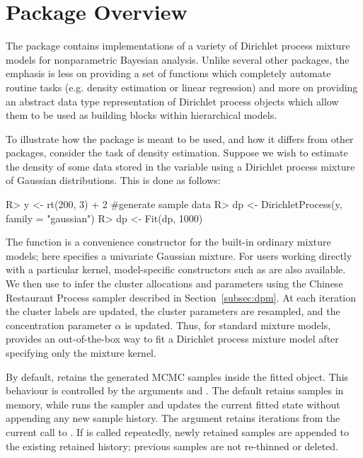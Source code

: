 \documentclass[nojss]{jss}
\begin{document}
\section{Package Overview}
\label{sec:package}

The  package contains implementations of a variety of Dirichlet process mixture models for nonparametric Bayesian analysis. Unlike several other  packages, the emphasis is less on providing a set of functions which completely automate routine tasks (e.g. density estimation or linear regression) and more on providing an abstract data type representation of Dirichlet process objects which allow them to be used as building blocks within hierarchical models.


To illustrate how the package is meant to be used, and how it differs from other  packages, consider the task of density estimation. Suppose we wish to estimate the density of some data stored in the variable  using a Dirichlet process mixture of Gaussian distributions. This is done as follows:

\begin{CodeInput}
R> y <- rt(200, 3) + 2 #generate sample data
R> dp <- DirichletProcess(y, family = "gaussian")
R> dp <- Fit(dp, 1000)
\end{CodeInput}
The function  is a convenience constructor for the built-in ordinary mixture models; here  specifies a univariate Gaussian mixture. For users working directly with a particular kernel, model-specific constructors such as  are also available. We then use  to infer the cluster allocations and parameters using the Chinese Restaurant Process sampler described in Section~\ref{subsec:dpm}. At each iteration the cluster labels are updated, the cluster parameters are resampled, and the concentration parameter $\alpha$ is updated. Thus, for standard mixture models,  provides an out-of-the-box way to fit a Dirichlet process mixture model after specifying only the mixture kernel.

By default,  retains the generated MCMC samples inside the fitted object. This behaviour is controlled by the arguments  and . The default  retains samples in memory, while  runs the sampler and updates the current fitted state without appending any new sample history. The argument  retains iterations  from the current call to . If  is called repeatedly, newly retained samples are appended to the existing retained history; previous samples are not re-thinned or deleted.
\end{document}
